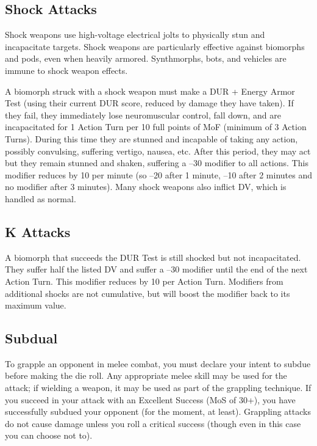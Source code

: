 \subsection{Shock Attacks}

Shock weapons use high-voltage electrical jolts to 
physically stun and incapacitate targets. Shock weapons
are particularly effective against biomorphs and
pods, even when heavily armored. Synthmorphs, bots, 
and vehicles are immune to shock weapon effects.

A biomorph struck with a shock weapon must 
make a DUR + Energy Armor Test (using their current
DUR score, reduced by damage they have taken).
If they fail, they immediately lose neuromuscular 
control, fall down, and are incapacitated for 1 Action 
Turn per 10 full points of MoF (minimum of 3 Action 
Turns). During this time they are stunned and incapable
of taking any action, possibly convulsing, suffering
vertigo, nausea, etc. After this period, they may
act but they remain stunned and shaken, suffering a 
–30 modifier to all actions. This modifier reduces by 
10 per minute (so –20 after 1 minute, –10 after 2 minutes
and no modifier after 3 minutes). Many shock
weapons also inflict DV, which is handled as normal.

\subsection{K Attacks}


A biomorph that succeeds the DUR Test is still 
shocked but not incapacitated. They suffer half the 
listed DV and suffer a –30 modifier until the end of 
the next Action Turn. This modifier reduces by 10 per 
Action Turn. Modifiers from additional shocks are 
not cumulative, but will boost the modifier back to 
its maximum value.

\subsection{Subdual}

To grapple an opponent in melee combat, you must 
declare your intent to subdue before making the die 
roll. Any appropriate melee skill may be used for the 
attack; if wielding a weapon, it may be used as part of 
the grappling technique. If you succeed in your attack 
with an Excellent Success (MoS of 30+), you have successfully
subdued your opponent (for the moment, at
least). Grappling attacks do not cause damage unless 
you roll a critical success (though even in this case you 
can choose not to).

